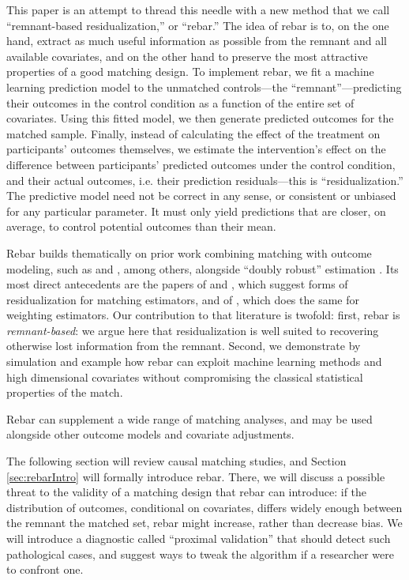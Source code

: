 \documentclass[12pt]{article}\usepackage[]{graphicx}\usepackage[]{color}
\begin{document}
This paper is an attempt to thread this needle with a new method that
we call ``remnant-based residualization,'' or ``rebar.''
The idea of rebar is to, on the one hand, extract as
much useful information as possible from the remnant and all available
covariates, and on the other hand to preserve the
most attractive properties of a good matching design.
To implement rebar, we fit a machine learning prediction model to the
unmatched controls---the ``remnant''---predicting
their outcomes in the control condition as a function of the entire
set of covariates.
Using this fitted model, we then generate predicted outcomes for the
matched sample.
Finally, instead of calculating the effect of the treatment on
participants' outcomes themselves, we estimate the intervention's
effect on the difference between participants' predicted outcomes
under the control condition, and their actual outcomes, i.e. their
prediction residuals---this is ``residualization.''
The predictive model need not be correct in any sense, or
consistent or unbiased for any particular parameter.
It must only yield predictions that are closer, on average, to control potential
outcomes than their mean.

Rebar builds thematically on prior work combining matching with
outcome modeling, such as \citet{rubin:1973b} and \citet{ho:etal:2007}, among others, alongside ``doubly robust'' estimation \citep[e.g.][]{kang2007demystifying}.
Its most direct antecedents are the papers of \citet{rosenbaum2002covariance} and
\citet{biasAdjust}, which suggest forms of residualization
for matching estimators, and of \citet{middleton2011unbiased}, which does
the same for weighting estimators.
Our contribution to that literature is twofold: first, rebar is
\emph{remnant-based}: we argue here that residualization is well
suited to recovering otherwise lost information from the remnant.
Second, we demonstrate by simulation and example how rebar can exploit machine
learning methods and high dimensional covariates without compromising
the classical statistical properties of the match.

Rebar can supplement a wide range of matching
analyses, and may be used alongside other outcome models
and covariate adjustments.

The following section will review causal matching studies, and Section \ref{sec:rebarIntro} will formally introduce rebar.
There, we will discuss a possible threat to the validity of a matching design that rebar can introduce: if the distribution of outcomes, conditional on covariates, differs widely enough between the remnant the matched set, rebar might increase, rather than decrease bias.
We will introduce a diagnostic called ``proximal validation'' that should detect such pathological cases, and suggest ways to tweak the algorithm if a researcher were to confront one.
\end{document}
